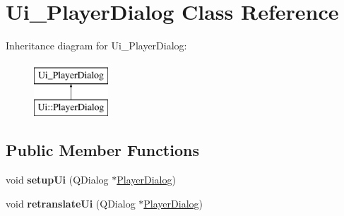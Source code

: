 \hypertarget{classUi__PlayerDialog}{\section{Ui\-\_\-\-Player\-Dialog Class Reference}
\label{classUi__PlayerDialog}
}
Inheritance diagram for Ui\-\_\-\-Player\-Dialog\-:\begin{figure}[H]
\begin{center}
\leavevmode
\includegraphics[height=2.000000cm]{classUi__PlayerDialog}
\end{center}
\end{figure}
\subsection*{Public Member Functions}
\begin{DoxyCompactItemize}
\item 
\hypertarget{classUi__PlayerDialog_a0ea34a28d6c510a07afc0abb0537767d}{void {\bfseries setup\-Ui} (Q\-Dialog $\ast$\hyperlink{classPlayerDialog}{Player\-Dialog})}\label{classUi__PlayerDialog_a0ea34a28d6c510a07afc0abb0537767d}

\item 
\hypertarget{classUi__PlayerDialog_aba529f69b1f8da81f43926c8116eb633}{void {\bfseries retranslate\-Ui} (Q\-Dialog $\ast$\hyperlink{classPlayerDialog}{Player\-Dialog})}\label{classUi__PlayerDialog_aba529f69b1f8da81f43926c8116eb633}

\end{DoxyCompactItemize}

